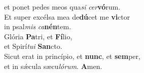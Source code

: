 \oddverse et ponet pedes meos qua\textit{si} \textit{cer}\textbf{vó}rum.\\
\evenverse Et super excélsa mea de\textbf{dú}cet me \textbf{vi}ctor~\*\\
\evenverse in psal\textit{mis} \textit{ca}\textbf{nén}tem.\\
\oddverse Glória \textbf{Pa}tri, et \textbf{Fí}lio,~\*\\
\oddverse et Spirí\textit{tu}\textit{i} \textbf{San}cto.\\
\evenverse Sicut erat in princípio, et \textbf{nunc}, et \textbf{sem}per,~\*\\
\evenverse et in sǽcula sæcu\textit{ló}\textit{rum}. \textbf{A}men.\\
